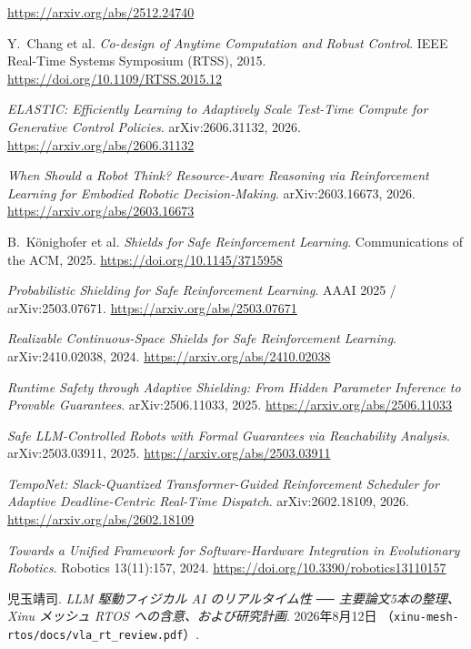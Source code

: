 \documentclass[11pt,a4paper]{article}
\newcommand{\code}[1]{\texttt{#1}}
\begin{document}
\begin{enumerate}[leftmargin=1.8em,itemsep=2pt,label={[\arabic*]}]
        \url{https://arxiv.org/abs/2512.24740}
  \item Y.~Chang et al. \emph{Co-design of Anytime Computation and Robust Control}.
        IEEE Real-Time Systems Symposium (RTSS), 2015.
        \url{https://doi.org/10.1109/RTSS.2015.12}
  \item \emph{ELASTIC: Efficiently Learning to Adaptively Scale Test-Time Compute
        for Generative Control Policies}. arXiv:2606.31132, 2026.
        \url{https://arxiv.org/abs/2606.31132}
  \item \emph{When Should a Robot Think? Resource-Aware Reasoning via Reinforcement
        Learning for Embodied Robotic Decision-Making}. arXiv:2603.16673, 2026.
        \url{https://arxiv.org/abs/2603.16673}
  \item B.~K\"onighofer et al. \emph{Shields for Safe Reinforcement Learning}.
        Communications of the ACM, 2025. \url{https://doi.org/10.1145/3715958}
  \item \emph{Probabilistic Shielding for Safe Reinforcement Learning}.
        AAAI 2025 / arXiv:2503.07671. \url{https://arxiv.org/abs/2503.07671}
  \item \emph{Realizable Continuous-Space Shields for Safe Reinforcement Learning}.
        arXiv:2410.02038, 2024. \url{https://arxiv.org/abs/2410.02038}
  \item \emph{Runtime Safety through Adaptive Shielding: From Hidden Parameter
        Inference to Provable Guarantees}. arXiv:2506.11033, 2025.
        \url{https://arxiv.org/abs/2506.11033}
  \item \emph{Safe LLM-Controlled Robots with Formal Guarantees via Reachability
        Analysis}. arXiv:2503.03911, 2025. \url{https://arxiv.org/abs/2503.03911}
  \item \emph{TempoNet: Slack-Quantized Transformer-Guided Reinforcement Scheduler
        for Adaptive Deadline-Centric Real-Time Dispatch}. arXiv:2602.18109, 2026.
        \url{https://arxiv.org/abs/2602.18109}
  \item \emph{Towards a Unified Framework for Software-Hardware Integration in
        Evolutionary Robotics}. Robotics 13(11):157, 2024.
        \url{https://doi.org/10.3390/robotics13110157}
  \item 児玉靖司. \emph{LLM 駆動フィジカル AI のリアルタイム性 ── 主要論文5本の整理、
        Xinu メッシュ RTOS への含意、および研究計画}. 2026年8月12日
        （\code{xinu-mesh-rtos/docs/vla\_rt\_review.pdf}）.
\end{enumerate}
\endgroup
\end{document}
